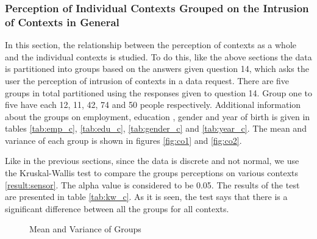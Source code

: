\subsubsection{Perception of Individual Contexts Grouped on the Intrusion of Contexts in General}

In this section, the relationship between the perception of contexts as a whole and the individual contexts is studied. 
To do this, like the above sections the data is partitioned into groups based on the answers given question 14, which asks the user the perception of intrusion of contexts in a data request. There are five groups in total partitioned using the responses given to question 14. Group one to five have each 12, 11, 42, 74 and 50 people respectively. Additional
information about the groups on employment, education , gender and year of birth is given in tables \ref{tab:emp_c}, \ref{tab:edu_c}, \ref{tab:gender_c} and \ref{tab:year_c}. The mean and variance of each group is shown in figures \ref{fig:co1} and \ref{fig:co2}.

Like in the previous sections, since the data is discrete and not normal, we use the Kruskal-Wallis test to compare the groups perceptions on various contexts \ref{result:sensor}. The alpha value is considered to be 0.05. The results of the test are presented in table \ref{tab:kw_c}. As it is seen, the test says that there is a significant difference between all the groups for all contexts.

\begin{figure}[htp]
\caption{Mean and Variance of Groups}
\label{fig:co3}
\end{figure}

